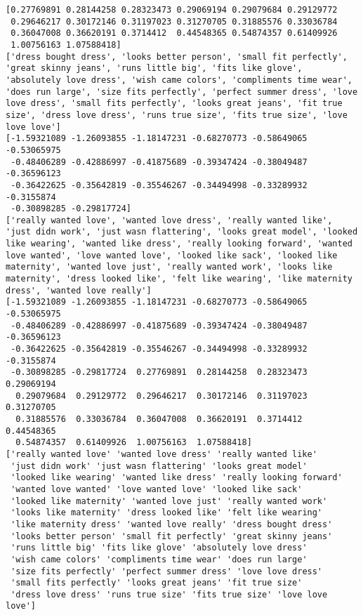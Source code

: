 \documentclass[11pt]{article}
\begin{document}
    \begin{Verbatim}[commandchars=\\\{\}]
[0.27769891 0.28144258 0.28323473 0.29069194 0.29079684 0.29129772
 0.29646217 0.30172146 0.31197023 0.31270705 0.31885576 0.33036784
 0.36047008 0.36620191 0.3714412  0.44548365 0.54874357 0.61409926
 1.00756163 1.07588418]
['dress bought dress', 'looks better person', 'small fit perfectly', 'great skinny jeans', 'runs little big', 'fits like glove', 'absolutely love dress', 'wish came colors', 'compliments time wear', 'does run large', 'size fits perfectly', 'perfect summer dress', 'love love dress', 'small fits perfectly', 'looks great jeans', 'fit true size', 'dress love dress', 'runs true size', 'fits true size', 'love love love']
[-1.59321089 -1.26093855 -1.18147231 -0.68270773 -0.58649065 -0.53065975
 -0.48406289 -0.42886997 -0.41875689 -0.39347424 -0.38049487 -0.36596123
 -0.36422625 -0.35642819 -0.35546267 -0.34494998 -0.33289932 -0.3155874
 -0.30898285 -0.29817724]
['really wanted love', 'wanted love dress', 'really wanted like', 'just didn work', 'just wasn flattering', 'looks great model', 'looked like wearing', 'wanted like dress', 'really looking forward', 'wanted love wanted', 'love wanted love', 'looked like sack', 'looked like maternity', 'wanted love just', 'really wanted work', 'looks like maternity', 'dress looked like', 'felt like wearing', 'like maternity dress', 'wanted love really']
[-1.59321089 -1.26093855 -1.18147231 -0.68270773 -0.58649065 -0.53065975
 -0.48406289 -0.42886997 -0.41875689 -0.39347424 -0.38049487 -0.36596123
 -0.36422625 -0.35642819 -0.35546267 -0.34494998 -0.33289932 -0.3155874
 -0.30898285 -0.29817724  0.27769891  0.28144258  0.28323473  0.29069194
  0.29079684  0.29129772  0.29646217  0.30172146  0.31197023  0.31270705
  0.31885576  0.33036784  0.36047008  0.36620191  0.3714412   0.44548365
  0.54874357  0.61409926  1.00756163  1.07588418]
['really wanted love' 'wanted love dress' 'really wanted like'
 'just didn work' 'just wasn flattering' 'looks great model'
 'looked like wearing' 'wanted like dress' 'really looking forward'
 'wanted love wanted' 'love wanted love' 'looked like sack'
 'looked like maternity' 'wanted love just' 'really wanted work'
 'looks like maternity' 'dress looked like' 'felt like wearing'
 'like maternity dress' 'wanted love really' 'dress bought dress'
 'looks better person' 'small fit perfectly' 'great skinny jeans'
 'runs little big' 'fits like glove' 'absolutely love dress'
 'wish came colors' 'compliments time wear' 'does run large'
 'size fits perfectly' 'perfect summer dress' 'love love dress'
 'small fits perfectly' 'looks great jeans' 'fit true size'
 'dress love dress' 'runs true size' 'fits true size' 'love love love']

    \end{Verbatim}
\end{document}

